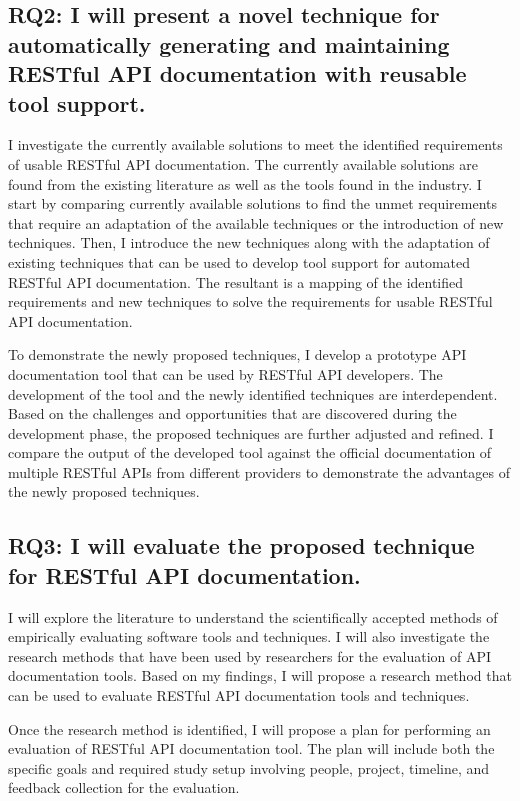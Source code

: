 \documentclass[11pt,oneside]{book}
\begin{document}
\subsection{RQ2: I will present a novel technique for automatically generating and maintaining RESTful API documentation with reusable tool support.}

I investigate the currently available solutions to meet the identified requirements of usable RESTful API documentation. The currently available solutions are found from the existing literature as well as the tools found in the industry. I start by comparing currently available solutions to find the unmet requirements that require an adaptation of the available techniques or the introduction of new techniques. Then, I introduce the new techniques along with the adaptation of existing techniques that can be used to develop tool support for automated RESTful API documentation. The resultant is a mapping of the identified requirements and new techniques to solve the requirements for usable RESTful API documentation.

To demonstrate the newly proposed techniques, I develop a prototype API documentation tool that can be used by RESTful API developers. The development of the tool and the newly identified techniques are interdependent. Based on the challenges and opportunities that are discovered during the development phase, the proposed techniques are further adjusted and refined. I compare the output of the developed tool against the official documentation of multiple RESTful APIs from different providers to demonstrate the advantages of the newly proposed techniques.

\subsection{RQ3: I will evaluate the proposed technique for RESTful API documentation.}

I will explore the literature to understand the scientifically accepted methods of empirically evaluating software tools and techniques. I will also investigate the research methods that have been used by researchers for the evaluation of API documentation tools. Based on my findings, I will propose a research method that can be used to evaluate RESTful API documentation tools and techniques.

Once the research method is identified, I will propose a plan for performing an evaluation of RESTful API documentation tool. The plan will include both the specific goals and required study setup involving people, project, timeline, and feedback collection for the evaluation.
\end{document}
